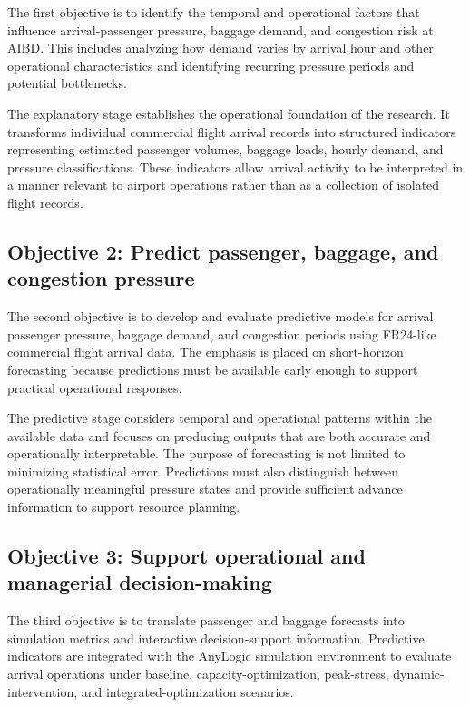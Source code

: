 The first objective is to identify the temporal and operational factors that influence arrival-passenger pressure, baggage demand, and congestion risk at AIBD. This includes analyzing how demand varies by arrival hour and other operational characteristics and identifying recurring pressure periods and potential bottlenecks.

The explanatory stage establishes the operational foundation of the research. It transforms individual commercial flight arrival records into structured indicators representing estimated passenger volumes, baggage loads, hourly demand, and pressure classifications. These indicators allow arrival activity to be interpreted in a manner relevant to airport operations rather than as a collection of isolated flight records.

\subsection*{Objective 2: Predict passenger, baggage, and congestion pressure}
{}

The second objective is to develop and evaluate predictive models for arrival passenger pressure, baggage demand, and congestion periods using FR24-like commercial flight arrival data. The emphasis is placed on short-horizon forecasting because predictions must be available early enough to support practical operational responses.

The predictive stage considers temporal and operational patterns within the available data and focuses on producing outputs that are both accurate and operationally interpretable. The purpose of forecasting is not limited to minimizing statistical error. Predictions must also distinguish between operationally meaningful pressure states and provide sufficient advance information to support resource planning.

\subsection*{Objective 3: Support operational and managerial decision-making}
{}

The third objective is to translate passenger and baggage forecasts into simulation metrics and interactive decision-support information. Predictive indicators are integrated with the AnyLogic simulation environment to evaluate arrival operations under baseline, capacity-optimization, peak-stress, dynamic-intervention, and integrated-optimization scenarios.

